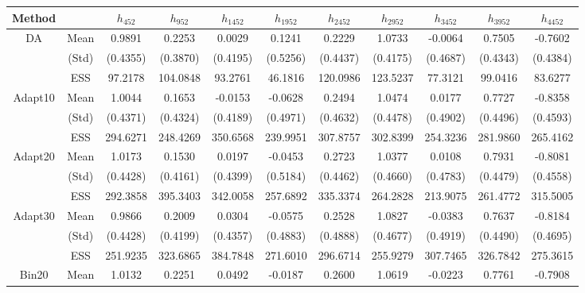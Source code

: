 { \renewcommand{\arraystretch}{1.2} 
\begin{table} 
\center 
\begin{tabular}{cc ccccccccc} 
 Method &  & $h_{452}$ & $h_{952}$ & $h_{1452}$ & $h_{1952}$ & $h_{2452}$ & $h_{2952}$ & $h_{3452}$ & $h_{3952}$ & $h_{4452}$ \\ \hline  \hline
\rowcolor{LightCyan} 
DA & Mean 
 & 0.9891  & 0.2253  & 0.0029  & 0.1241  & 0.2229  & 1.0733  & -0.0064  & 0.7505  & -0.7602  \\  [0.75ex] 
 & (Std) 
 & (0.4355)  & (0.3870)  & (0.4195)  & (0.5256)  & (0.4437)  & (0.4175)  & (0.4687)  & (0.4343)  & (0.4384)  \\  [0.75ex] 
 [ 36.22 s] & ESS 
 & 97.2178  & 104.0848  & 93.2761  & 46.1816  & 120.0986  & 123.5237  & 77.3121  & 99.0416  & 83.6277  \\  [0.75ex] 
\rowcolor{LightCyan} 
Adapt10 & Mean 
 & 1.0044  & 0.1653  & -0.0153  & -0.0628  & 0.2494  & 1.0474  & 0.0177  & 0.7727  & -0.8358  \\  [0.75ex] 
 & (Std) 
 & (0.4371)  & (0.4324)  & (0.4189)  & (0.4971)  & (0.4632)  & (0.4478)  & (0.4902)  & (0.4496)  & (0.4593)  \\  [0.75ex] 
 [642.03 s] & ESS 
 & 294.6271  & 248.4269  & 350.6568  & 239.9951  & 307.8757  & 302.8399  & 254.3236  & 281.9860  & 265.4162  \\  [0.75ex] 
\rowcolor{LightCyan} 
Adapt20 & Mean 
 & 1.0173  & 0.1530  & 0.0197  & -0.0453  & 0.2723  & 1.0377  & 0.0108  & 0.7931  & -0.8081  \\  [0.75ex] 
 & (Std) 
 & (0.4428)  & (0.4161)  & (0.4399)  & (0.5184)  & (0.4462)  & (0.4660)  & (0.4783)  & (0.4479)  & (0.4558)  \\  [0.75ex] 
 [760.91 s] & ESS 
 & 292.3858  & 395.3403  & 342.0058  & 257.6892  & 335.3374  & 264.2828  & 213.9075  & 261.4772  & 315.5005  \\  [0.75ex] 
\rowcolor{LightCyan} 
Adapt30 & Mean 
 & 0.9866  & 0.2009  & 0.0304  & -0.0575  & 0.2528  & 1.0827  & -0.0383  & 0.7637  & -0.8184  \\  [0.75ex] 
 & (Std) 
 & (0.4428)  & (0.4199)  & (0.4357)  & (0.4883)  & (0.4888)  & (0.4677)  & (0.4919)  & (0.4490)  & (0.4695)  \\  [0.75ex] 
 [855.32 s] & ESS 
 & 251.9235  & 323.6865  & 384.7848  & 271.6010  & 296.6714  & 255.9279  & 307.7465  & 326.7842  & 275.3615  \\  [0.75ex] 
\rowcolor{LightCyan} 
Bin20 & Mean 
 & 1.0132  & 0.2251  & 0.0492  & -0.0187  & 0.2600  & 1.0619  & -0.0223  & 0.7761  & -0.7908  \\  [0.75ex] 

\end{tabular}
\end{table}}
